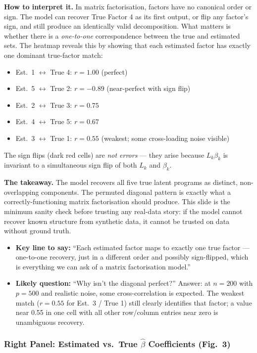 \documentclass[11pt]{article}
\newcommand{\sectionlabel}[1]{\textbf{#1}}
\begin{document}
\textbf{How to interpret it.} In matrix factorisation, factors have no canonical order or sign. The model can recover True Factor 4 as its first output, or flip any factor's sign, and still produce an identically valid decomposition. What matters is whether there is a \emph{one-to-one} correspondence between the true and estimated sets. The heatmap reveals this by showing that each estimated factor has exactly one dominant true-factor match:
\begin{itemize}
  \item Est.\ 1 $\leftrightarrow$ True 4: $r = 1.00$ (perfect)
  \item Est.\ 5 $\leftrightarrow$ True 2: $r = -0.89$ (near-perfect with sign flip)
  \item Est.\ 2 $\leftrightarrow$ True 3: $r = 0.75$
  \item Est.\ 4 $\leftrightarrow$ True 5: $r = 0.67$
  \item Est.\ 3 $\leftrightarrow$ True 1: $r = 0.55$ (weakest; some cross-loading noise visible)
\end{itemize}
The sign flips (dark red cells) are \emph{not errors} --- they arise because $L_k \beta_k$ is invariant to a simultaneous sign flip of both $L_k$ and $\beta_k$.

\textbf{The takeaway.} The model recovers all five true latent programs as distinct, non-overlapping components. The permuted diagonal pattern is exactly what a correctly-functioning matrix factorisation should produce. This slide is the minimum sanity check before trusting any real-data story: if the model cannot recover known structure from synthetic data, it cannot be trusted on data without ground truth.

\begin{itemize}
  \item \sectionlabel{Key line to say:} ``Each estimated factor maps to exactly one true factor --- one-to-one recovery, just in a different order and possibly sign-flipped, which is everything we can ask of a matrix factorisation model.''
  \item \sectionlabel{Likely question:} ``Why isn't the diagonal perfect?'' Answer: at $n = 200$ with $p = 500$ and realistic noise, some cross-correlation is expected. The weakest match ($r = 0.55$ for Est.\ 3 / True 1) still clearly identifies that factor; a value near 0.55 in one cell with all other row/column entries near zero is unambiguous recovery.
\end{itemize}

\subsubsection*{Right Panel: Estimated vs.\ True $\hat{\beta}$ Coefficients (Fig.~3)}
\end{document}
